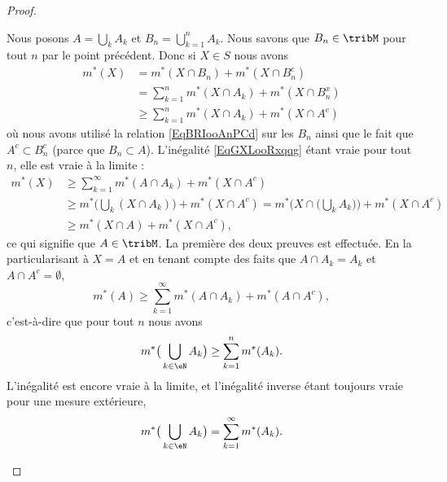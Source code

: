\begin{proof}
\begin{subproof}
        Nous posons \( A=\bigcup_kA_k\) et \( B_n=\bigcup_{k=1}^nA_k\). Nous savons que \( B_n\in\tribM\) pour tout \( n\) par le point précédent. Donc si \( X\in S\) nous avons
        \begin{subequations}
            \begin{align}   \label{EqGXLooRxqqg}
                m^*(X)  & =m^*(X\cap B_n)+m^*(X\cap B_n^c)                      \\
                        & =   \sum_{k=1}^nm^*(X\cap A_k)+m^*(X\cap B_n^x)       \\
                        & \geq\sum_{k=1}^nm^*(X\cap A_k)+m^*(X\cap A^c)
            \end{align}
        \end{subequations}
        où nous avons utilisé la relation \eqref{EqBRIooAnPCd} sur les \( B_n\) ainsi que le fait que \( A^c\subset B_n^c\) (parce que \( B_n\subset A\)). L'inégalité \eqref{EqGXLooRxqqg} étant vraie pour tout \( n\), elle est vraie à la limite :
        \begin{subequations}
            \begin{align}
                m^*(X)  & \geq \sum_{k=1}^{\infty}m^*(A\cap A_k)+m^*(X\cap A^c)                     \\
                        & \geq m^*\Big( \bigcup_k(X\cap A_k) \Big)+m^*(X\cap A^c)
                          =    m^*\Big( X\cap \big( \bigcup_kA_k \big) \Big)+m^*(X\cap A^c)         \\
                        & \geq m^*(X\cap A)+m^*(X\cap A^c),
            \end{align}
        \end{subequations}
        ce qui signifie que \( A\in\tribM\). La première des deux preuves est effectuée. En la particularisant à \( X=A\) et en tenant compte des faits que \( A\cap A_k=A_k\) et \( A\cap A^c=\emptyset\),
        \begin{equation}
            m^*(A)\geq \sum_{k=1}^{\infty}m^*(A\cap A_k)+m^*(A\cap A^c),
        \end{equation}
        c'est-à-dire que pour tout \( n\) nous avons
        \begin{equation}
            m^*\big( \bigcup_{k\in \eN}A_k \big)\geq \sum_{k=1}^nm^*(A_k).
        \end{equation}
        L'inégalité est encore vraie à la limite, et l'inégalité inverse étant toujours vraie pour une mesure extérieure,
        \begin{equation}
            m^*\big( \bigcup_{k\in \eN}A_k \big)=\sum_{k=1}^{\infty}m^*(A_k).
        \end{equation}


\end{subproof}
\end{proof}
